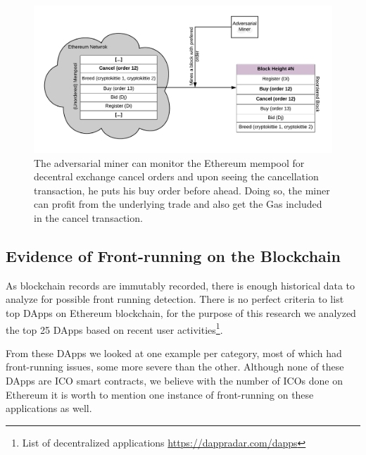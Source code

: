 
\begin{figure}[h]
\centering
\includegraphics[width=0.7\linewidth]{figures/Miner_reorder_frontrun.png}
\caption{The adversarial miner can monitor the Ethereum mempool for decentral exchange cancel orders and upon seeing the cancellation transaction, he puts his buy order before ahead. Doing so, the miner can profit from the underlying trade and also get the Gas included in the cancel transaction. \label{fig:MinerFrontrunning}} 
\end{figure}


\subsection{Evidence of Front-running on the Blockchain}  

As blockchain records are immutably recorded, there is enough historical data to analyze for possible front running detection. There is no perfect criteria to list top DApps on Ethereum blockchain, for the purpose of this research we analyzed the top 25 DApps based on recent user activities\footnote{List of decentralized applications \url{https://dappradar.com/dapps}}. 



From these DApps we looked at one example per category, most of which had front-running issues, some more severe than the other. Although none of these DApps are ICO smart contracts, we believe with the number of ICOs done on Ethereum it is worth to mention one instance of front-running on these applications as well. 




